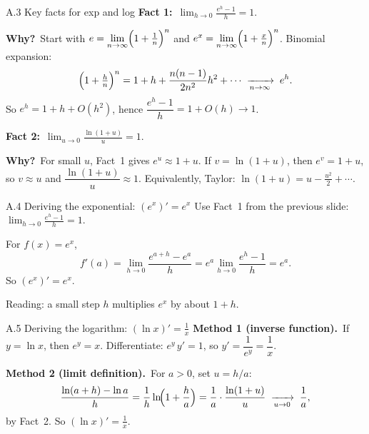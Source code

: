 \documentclass[11pt,aspectratio=169]{beamer}
\begin{document}
\begin{frame}{A.3 Key facts for exp and log}
  \footnotesize
  \textbf{Fact 1:}\ $\displaystyle\lim_{h\to 0}\frac{e^h-1}{h}=1$.

  \smallskip
  \textbf{Why?}\ Start with
  $e=\displaystyle\lim_{n\to\infty}\Bigl(1+\tfrac{1}{n}\Bigr)^n$ and
  $e^x=\displaystyle\lim_{n\to\infty}\Bigl(1+\tfrac{x}{n}\Bigr)^n$.
  Binomial expansion:
  \[
    \Bigl(1+\tfrac{h}{n}\Bigr)^n
    =1+h+\frac{n(n-1)}{2n^2}h^2+\cdots
    \;\xrightarrow[n\to\infty]{}\; e^h.
  \]
  So $e^h=1+h+O(h^2)$, hence
  $\dfrac{e^h-1}{h}=1+O(h)\to 1$.

  \medskip
  \textbf{Fact 2:}\ $\displaystyle\lim_{u\to 0}\frac{\ln(1+u)}{u}=1$.

  \smallskip
  \textbf{Why?}\ For small $u$, Fact~1 gives $e^u\approx 1+u$.
  If $v=\ln(1+u)$, then $e^v=1+u$, so $v\approx u$ and
  $\dfrac{\ln(1+u)}{u}\approx 1$.
  Equivalently, Taylor: $\ln(1+u)=u-\tfrac{u^2}{2}+\cdots$.
\end{frame}

\begin{frame}{A.4 Deriving the exponential: $(e^x)'=e^x$}
  \small
  Use Fact~1 from the previous slide:
  $\displaystyle\lim_{h\to 0}\frac{e^h-1}{h}=1$.

  \medskip
  For $f(x)=e^x$,
  \[
    f'(a)=\lim_{h\to 0}\frac{e^{a+h}-e^a}{h}
    =e^a\lim_{h\to 0}\frac{e^h-1}{h}
    =e^a.
  \]
  So $(e^x)'=e^x$.

  \medskip
  {\scriptsize Reading: a small step $h$ multiplies $e^x$ by about $1+h$.}
\end{frame}

\begin{frame}{A.5 Deriving the logarithm: $(\ln x)'=\tfrac{1}{x}$}
  \small
  \textbf{Method 1 (inverse function).}\ If $y=\ln x$, then $e^y=x$.
  Differentiate: $e^y\,y'=1$, so $y'=\dfrac{1}{e^y}=\dfrac{1}{x}$.

  \medskip
  \textbf{Method 2 (limit definition).}\ For $a>0$, set $u=h/a$:
  \[
    \frac{\ln(a+h)-\ln a}{h}
    =\frac{1}{h}\ln\!\Bigl(1+\frac{h}{a}\Bigr)
    =\frac{1}{a}\cdot\frac{\ln(1+u)}{u}
    \;\xrightarrow[u\to 0]{}\;
    \frac{1}{a},
  \]
  by Fact~2. So $(\ln x)'=\tfrac{1}{x}$.
\end{frame}
\end{document}
